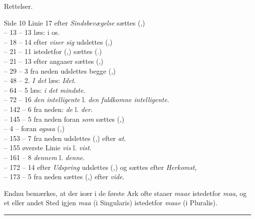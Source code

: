 \documentclass[12pt,a4paper]{book}
\newcommand{\apage}[1]{\marginnote{\footnotesize\textit{[#1]}}}
\begin{document}

\bigskip
\apage{205} \begin{center}\large Rettelser.\end{center}

\noindent
Side 10 Linie 17 efter \emph{Sindsbevægelse} sættes (,)\\
-- 13 -- 13 læs: i os.\\
-- 18 -- 14 efter \emph{viser sig} udslettes (,)\\
-- 21 -- 11 istedetfor (,) sættes (.)\\
-- 21 -- 13 efter angaaer sættes (,)\\
-- 29 -- 3 fra neden udslettes begge (,)\\
-- 48 -- 2. \emph{I det} læs: \emph{Idet}.\\
-- 64 -- 5 læs: \emph{i det mindste}.\\
-- 72 -- 16 \emph{den intelligente} l. \emph{den fuldkomne intelligente}.\\
-- 142 -- 6 fra neden: \emph{de} l. \emph{der}.\\
-- 145 -- 5 fra neden foran \emph{som} sættes (,)\\
\hspace*{3em}-- 4 \hspace{2em}-- \hspace{2em}foran \emph{ogsaa} (,)\\
-- 153 -- 7 fra neden udslettes (,) efter \emph{at}.\\
-- 155 øverste Linie \emph{vis} l. \emph{vist}.\\
-- 161 -- 8 \emph{dennem} l. \emph{denne}.\\
-- 172 -- 14 efter \emph{Udspring} udslettes (,) og sættes efter \emph{Herkomst},\\
-- 173 -- 5 fra neden sættes (,) efter \emph{vide}.

\medskip
Endnu bemærkes, at der især i de første Ark ofte staaer \emph{maae} istedetfor
\emph{maa}, og et eller andet Sted igjen \emph{maa} (i Singularis) istedetfor \emph{maae}
(i Pluralis).

\begin{center}\rule{0.28\linewidth}{0.4pt}\end{center}

\end{document}
